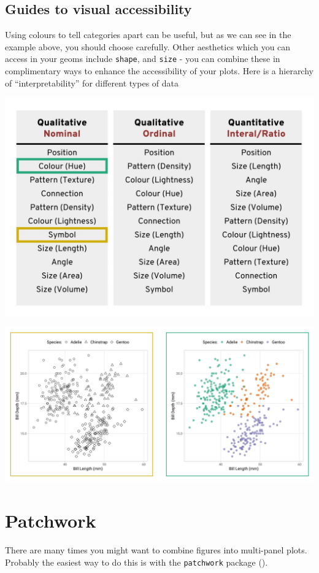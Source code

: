 \documentclass[
]{book}
\begin{document}
\hypertarget{guides-to-visual-accessibility}{%
\subsection{Guides to visual accessibility}\label{guides-to-visual-accessibility}}

Using colours to tell categories apart can be useful, but as we can see in the example above, you should choose carefully. Other aesthetics which you can access in your geoms include \texttt{shape}, and \texttt{size} - you can combine these in complimentary ways to enhance the accessibility of your plots. Here is a hierarchy of ``interpretability'' for different types of data

\includegraphics[width=0.8\linewidth]{images/list}

\includegraphics[width=0.8\linewidth]{images/shape_v_colour}

\hypertarget{patchwork}{%
\section{Patchwork}\label{patchwork}}

There are many times you might want to combine figures into multi-panel plots. Probably the easiest way to do this is with the \texttt{patchwork} package (\citet{R-patchwork}).
\end{document}
